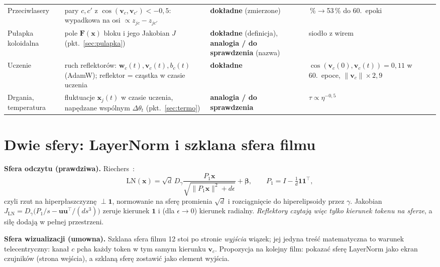 \documentclass[a4paper,11pt]{article}
\newcommand{\DOK}{\textcolor{dok}{\textbf{dokładne}}}
\newcommand{\ANA}{\textcolor{ana}{\textbf{analogia / do sprawdzenia}}}
\newcommand{\LN}{\mathrm{LN}}
\begin{document}
\begin{longtable}{>{\raggedright\arraybackslash}p{3.1cm}>{\raggedright\arraybackslash}p{5.9cm}>{\raggedright\arraybackslash}p{2.4cm}>{\raggedright\arraybackslash}p{3.6cm}}
Przeciwlasery & pary $c,c'$ z $\cos(\bm v_c,\bm v_{c'})<-0{,}5$: wypadkowa na osi $\propto z_{jc}-z_{jc'}$ & \DOK{} (zmierzone) & 0\,\%$\to$53\,\% do 60.~epoki\\
Pułapka koloidalna & pole $\bm F(\bm x)$ bloku i jego Jakobian $J$ (pkt.~\ref{sec:pulapka}) & \DOK{} (definicja), \ANA{} (nazwa) & siodło z wirem\\
Uczenie & ruch reflektorów: $\bm w_c(t),\bm v_c(t),b_c(t)$ (AdamW); reflektor = cząstka w czasie uczenia & \DOK & $\cos(\bm v_c(0),\bm v_c(t))=0{,}11$ w 60.~epoce, $\lVert\bm v_c\rVert\times2{,}9$ \cite{mei18,herty26}\\
Drgania, temperatura & fluktuacje $\bm x_j(t)$ w czasie uczenia, napędzane wspólnym $\Delta\theta_t$ (pkt.~\ref{sec:termo}) & \ANA & $\tau\propto\eta^{-0{,}5}$\\
\bottomrule
\end{longtable}

\section{Dwie sfery: LayerNorm i szklana sfera filmu}\label{sec:sfery}
\textbf{Sfera odczytu (prawdziwa).} Riechers~\cite{riechers24}:
\begin{equation}
\LN(\bm x)=\sqrt d\,D_\gamma\frac{P_1\bm x}{\sqrt{\lVert P_1\bm x\rVert^2+d\epsilon}}+\bm\beta,\qquad P_1=I-\tfrac1d\bm 1\bm 1^{\!\top},
\end{equation}
czyli rzut na hiperpłaszczyznę $\perp\bm 1$, normowanie na sferę promienia $\sqrt d$ i rozciągnięcie do hiperelipsoidy przez $\gamma$.
Jakobian $J_{\LN}=D_\gamma\big(P_1/s-\bm u\bm u^{\!\top}/(d s^3)\big)$ zeruje kierunek $\bm 1$ i (dla $\epsilon\to0$) kierunek radialny.
\emph{Reflektory czytają więc tylko kierunek tokenu na sferze}, a siłę dodają w pełnej przestrzeni.

\textbf{Sfera wizualizacji (umowna).} Szklana sfera filmu 12 stoi po stronie \emph{wyjścia} wiązek; jej jedyna treść matematyczna to
warunek telecentryczny: kanał $c$ pcha każdy token w tym samym kierunku $\bm v_c$. Propozycja na kolejny film: pokazać sferę
LayerNorm jako ekran czujników (strona wejścia), a szklaną sferę zostawić jako element wyjścia.
\end{document}
